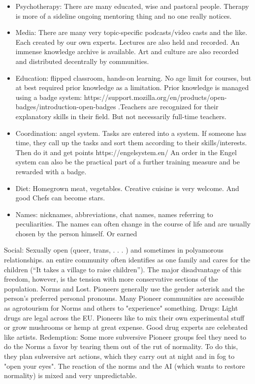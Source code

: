 \begin{itemize}
    \item Psychotherapy: There are many educated, wise and pastoral people. Therapy is more of a sideline ongoing mentoring thing and no one really notices.
    \item Media: There are many very topic-specific podcasts/video casts and the like. Each created by our own experts. Lectures are also held and recorded. An immense knowledge archive is available. Art and culture are also recorded and distributed decentrally by communities.
    \item Education: flipped classroom, hands-on learning. No age limit for courses, but at best required prior knowledge as a limitation. Prior knowledge is managed using a badge system: https://support.mozilla.org/en/products/open-badges/introduction-open-badges .Teachers are recognized for their explanatory skills in their field. But not necessarily full-time teachers.
    \item Coordination: angel system. Tasks are entered into a system. If someone has time, they call up the tasks and sort them according to their skills/interests. Then do it and get points https://engelsystem.en/ An order in the Engel system can also be the practical part of a further training measure and be rewarded with a badge.
    \item Diet: Homegrown meat, vegetables. Creative cuisine is very welcome. And good Chefs can become stars.
    \item Names: nicknames, abbreviations, chat names, names referring to peculiarities. The names can often change in the course of life and are usually chosen by the person himself. Or earned
\end{itemize}

Social: Sexually open (queer, trans, . . . ) and sometimes in polyamorous relationships. an entire community often identifies as one family and cares for the children (“It takes a village to raise children”).
The major disadvantage of this freedom, however, is the tension with more conservative sections of the population. Norms and Lost. Pioneers generally use the gender asterisk and the person's preferred personal pronouns. Many Pioneer communities are accessible as agrotourism for Norms and others to "experience" something.
Drugs: Light drugs are legal across the EU. Pioneers like to mix their own experimental stuff or grow mushrooms or hemp at great expense. Good drug experts are celebrated like artists.
Redemption: Some more subversive Pioneer groups feel they need to do the Norms a favor by tearing them out of the rut of normality. To do this, they plan subversive art actions, which they carry out at night and in fog to "open your eyes". The reaction of the norms and the AI (which wants to restore normality) is mixed and very unpredictable.


